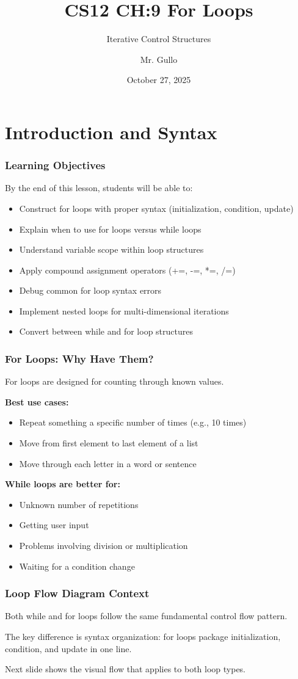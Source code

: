 \documentclass{beamer}
\title[For Loops]{CS12 CH:9 For Loops}
\subtitle{Iterative Control Structures}
\author[Mr. Gullo]{Mr. Gullo}
\date[Oct 27, 2025]{October 27, 2025}
\begin{document}
\frame{\titlepage}

\section{Introduction and Syntax}

\begin{frame}
\frametitle{Learning Objectives}
By the end of this lesson, students will be able to:
\begin{itemize}
\item Construct for loops with proper syntax (initialization, condition, update)
\item Explain when to use for loops versus while loops
\item Understand variable scope within loop structures
\item Apply compound assignment operators (+=, -=, *=, /=)
\item Debug common for loop syntax errors
\item Implement nested loops for multi-dimensional iterations
\item Convert between while and for loop structures
\end{itemize}
\end{frame}

\begin{frame}
\frametitle{For Loops: Why Have Them?}
For loops are designed for counting through known values.\pause

\textbf{Best use cases:}
\begin{itemize}
\item Repeat something a specific number of times (e.g., 10 times)
\item Move from first element to last element of a list
\item Move through each letter in a word or sentence
\end{itemize}
\pause

\textbf{While loops are better for:}
\begin{itemize}
\item Unknown number of repetitions
\item Getting user input
\item Problems involving division or multiplication
\item Waiting for a condition change
\end{itemize}
\end{frame}

\begin{frame}
\frametitle{Loop Flow Diagram Context}
Both while and for loops follow the same fundamental control flow pattern.\pause

The key difference is syntax organization: for loops package initialization, condition, and update in one line.\pause

Next slide shows the visual flow that applies to both loop types.
\end{frame}
\end{document}
